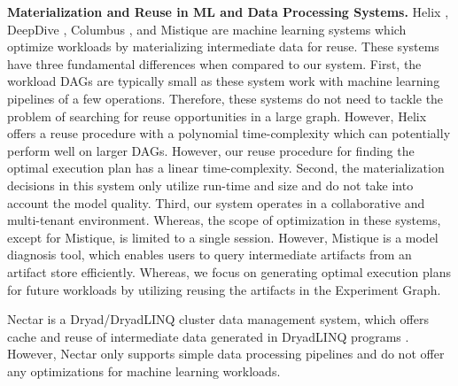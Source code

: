 \textbf{Materialization and Reuse in ML and Data Processing Systems.}
Helix \cite{xin2018h, xin2018helix}, DeepDive \cite{zhang2015deepdive}, Columbus \cite{zhang2016materialization}, and Mistique \cite{vartak2018mistique} are machine learning  systems which optimize workloads by materializing intermediate data for reuse.
These systems have three fundamental differences when compared to our system.
First, the workload DAGs are typically small as these system work with machine learning pipelines of a few operations.
Therefore, these systems do not need to tackle the problem of searching for reuse opportunities in a large graph.
However, Helix offers a reuse procedure with a polynomial time-complexity which can potentially perform well on larger DAGs.
However, our reuse procedure for finding the optimal execution plan has a linear time-complexity.
Second, the materialization decisions in this system only utilize run-time and size and do not take into account the model quality.
Third, our system operates in a collaborative and multi-tenant environment.
Whereas, the scope of optimization in these systems, except for Mistique, is limited to a single session.
However, Mistique is a model diagnosis tool, which enables users to query intermediate artifacts from an artifact store efficiently.
Whereas, we focus on generating optimal execution plans for future workloads by utilizing reusing the artifacts in the Experiment Graph.

Nectar \cite{gunda2010nectar} is a  Dryad/DryadLINQ cluster data management system, which offers cache and reuse of intermediate data generated in DryadLINQ programs \cite{fetterly2009dryadlinq}.
However, Nectar only supports simple data processing pipelines and do not offer any optimizations for machine learning workloads.


